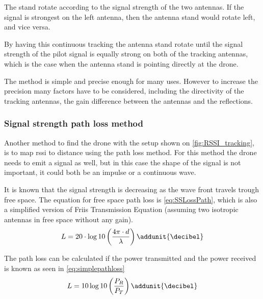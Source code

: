 The stand rotate according to the signal strength of the two antennas. If the signal is strongest on the left antenna, then the antenna stand would rotate left, and vice versa.

By having this continuous tracking the antenna stand rotate until the signal strength of the pilot signal is equally strong on both of the tracking antennas, which is the case when the antenna stand is pointing directly at the drone. 

The method is simple and precise enough for many uses. However to increase the precision many factors have to be considered, including the directivity of the tracking antennas, the gain difference between the antennas and the reflections. 

\subsubsection{Signal strength path loss method}\label{subsec:SignalStrengthPathLossMethod}
Another method to find the drone with the setup shown on \autoref{fig:RSSI_tracking}, is to map \gls{rssi} to distance using the path loss method. For this method the drone needs to emit a signal as well, but in this case the shape of the signal is not important, it could both be an impulse or a continuous wave.

It is known that the signal strength is decreasing as the wave front travels trough free space. The equation for free space path loss is \autoref{eq:SSLossPath}, which is also a simplified version of Friis Transmission Equation (assuming two isotropic antennas in free space without any gain).
\begin{equation} \label{eq:SSLossPath} 
L = 20 \cdot \log10\left(\frac{4\pi\cdot d}{\lambda}\right) \addunit{\decibel}
\end{equation}
\startexplain
{}
\stopexplain

The path loss can be calculated if the power transmitted and the power received is known as seen in \autoref{eq:simplepathloss}
\begin{equation} \label{eq:simplepathloss}
L = 10\log10\left(\frac{P_R}{P_T}\right)  \addunit{\decibel}
\end{equation}
\startexplain
{}
\stopexplain

